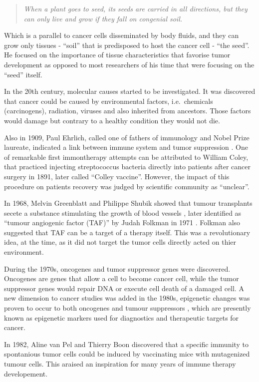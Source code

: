 \documentclass[12pt,]{book}
\theoremstyle{definition}
\theoremstyle{definition}
\theoremstyle{definition}
\theoremstyle{remark}
\begin{document}
\begin{quote}
\emph{When a plant goes to seed, its seeds are carried in all
directions, but they can only live and grow if they fall on congenial
soil.}
\end{quote}

Which is a parallel to cancer cells disseminated by body fluids, and
they can grow only tissues - ``soil'' that is predisposed to host the
cancer cell - ``the seed''. He focused on the importance of tissue
characteristics that favorise tumor development as opposed to most
researchers of his time that were focusing on the ``seed'' itself.

In the 20th century, molecular causes started to be investigated. It was
discovered that cancer could be caused by environmental factors,
i.e.~chemicals (carcinogens), radiation, viruses and also inherited from
ancestors. Those factors would damage but contrary to a healthy
condition they would not die.

Also in 1909, Paul Ehrlich, called one of fathers of immunology and
Nobel Prize laureate, indicated a link between immune system and tumor
suppression \citep{Ehrlich1909}. One of remarkable first immontherapy
attempts can be attributed to William Coley, that practiced injecting
streptococcus bacteria directly into patients after cancer surgery in
1891, later called ``Colley vaccine''. However, the impact of this
procedure on patients recovery was judged by scientific community as
``unclear''.

In 1968, Melvin Greenblatt and Philippe Shubik showed that tumour
transplants secete a substance stimulating the growth of blood vessels
\citep{Greenblatt1968}, later identified as ``tumour angiogenic factor
(TAF)'' by Judah Folkman in 1971 \citep{Folkman1971}. Folkman also
suggested that TAF can be a target of a therapy itself. This was a
revolutionary idea, at the time, as it did not target the tumor cells
directly acted on thier environment.

During the 1970s, oncogenes and tumor suppressor genes were discovered.
Oncogenes are genes that allow a cell to become cancer cell, while the
tumor suppressor genes would repair DNA or execute cell death of a
damaged cell. A new dimension to cancer studies was added in the 1980s,
epigenetic changes was proven to occur to both oncogenes and tumour
suppressors \citep{Feinberg1983, Greger1989}, which are presently known
as epigenetic markers used for diagnostics and therapeutic targets for
cancer.

In 1982, Aline van Pel and Thierry Boon \citep{VanPel1982} discovered
that a specific immunity to spontanious tumor cells could be induced by
vaccinating mice with mutagenized tumour cells. This araised an
inspiration for many years of immune therapy developement.
\end{document}
